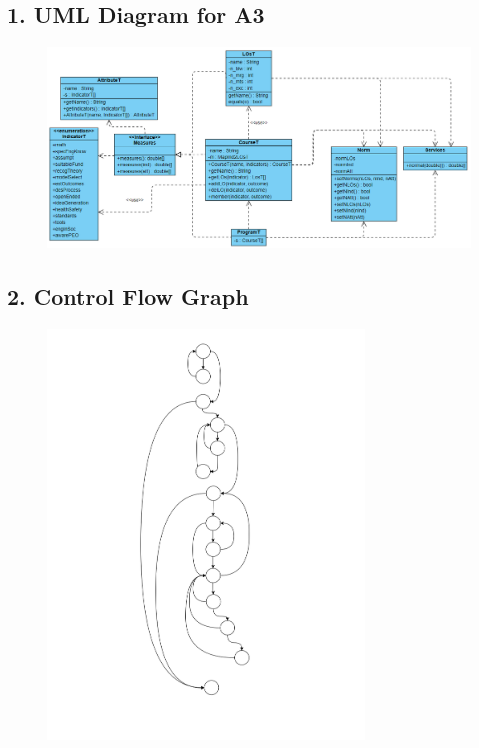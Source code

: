 \documentclass{article}
\begin{document}
	\subsection*{1. UML Diagram for A3}
	\begin{figure}[h]
		\centering
		\includegraphics[width=1.0\textwidth]{assets/Q1_UML.png}
	\end{figure}

	\newpage 

	\subsection*{2. Control Flow Graph}
	\begin{figure}[h]
		\centering
		\includegraphics[width=0.75\textwidth]{assets/Q2_ControlFlow.png}
	\end{figure}
\end{document}
